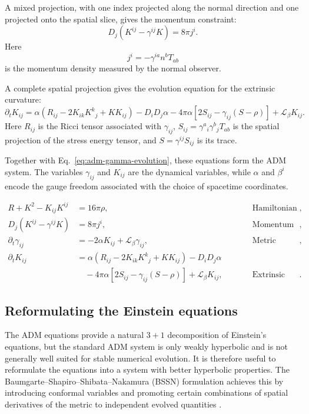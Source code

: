 A mixed projection, with one index projected along the normal direction and one projected onto the spatial slice, gives the momentum constraint:
\begin{equation}
D_j \left( K^{ij} - \gamma^{ij}K \right)
=
8\pi j^i .
\label{eq:momentum}
\end{equation}
Here
\begin{equation}
j^i
=
-\gamma^{ia}n^b T_{ab}
\end{equation}
is the momentum density measured by the normal observer.

A complete spatial projection gives the evolution equation for the extrinsic curvature:
\begin{equation}
\partial_t K_{ij}
=
\alpha
\left(
R_{ij}
- 2K_{ik}K^k{}_{j}
+ K K_{ij}
\right)
- D_iD_j\alpha
- 4\pi\alpha
\left[
2S_{ij}
-
\gamma_{ij}\left(S-\rho\right)
\right]
+
\mathcal{L}_{\beta}K_{ij}.
\label{eq:adm-k-evolution}
\end{equation}
Here $R_{ij}$ is the Ricci tensor associated with $\gamma_{ij}$, 
$S_{ij} = \gamma^a{}_{i}\gamma^b{}_{j}T_{ab}$ 
is the spatial projection of the stress energy tensor, and
$S = \gamma^{ij}S_{ij}$ is its trace.

Together with Eq.~\eqref{eq:adm-gamma-evolution}, these equations form the ADM system. The variables $\gamma_{ij}$ and $K_{ij}$ are the dynamical variables, while $\alpha$ and $\beta^i$ encode the gauge freedom associated with the choice of spacetime coordinates.

\begin{equation}
\boxed{
\begin{alignedat}{3}
R + K^2 - K_{ij}K^{ij}
&= 16\pi \rho,
&\qquad&
\text{Hamiltonian constraint},
\\[0.5em]
D_j \left( K^{ij} - \gamma^{ij}K \right)
&= 8\pi j^i,
&&
\text{Momentum constraint},
\\[0.5em]
\partial_t \gamma_{ij}
&= -2\alpha K_{ij}
+ \mathcal{L}_{\beta}\gamma_{ij},
&&
\text{Metric evolution},
\\[0.5em]
\partial_t K_{ij}
&= \alpha
\left(
R_{ij}
- 2K_{ik}K^k{}_{j}
+ K K_{ij}
\right)
- D_iD_j\alpha
&&
\\
&\quad
- 4\pi\alpha
\left[
2S_{ij}
-
\gamma_{ij}(S-\rho)
\right]
+ \mathcal{L}_{\beta}K_{ij},
&&
\text{Extrinsic curvature evolution}.
\end{alignedat}
}
\end{equation}
\subsection{Reformulating the Einstein equations}
The ADM equations provide a natural $3+1$ decomposition of Einstein's equations, but the standard ADM system is only weakly hyperbolic and is not generally well suited for stable numerical evolution. It is therefore useful to reformulate the equations into a system with better hyperbolic properties. The Baumgarte--Shapiro--Shibata--Nakamura (BSSN) formulation achieves this by introducing conformal variables and promoting certain combinations of spatial derivatives of the metric to independent evolved quantities \cite{Shibata1995_BSSN,Baumgarte1999_BSSN,Baumgarte2010}.

